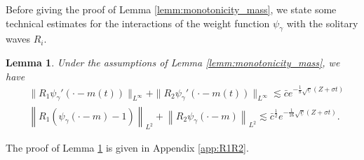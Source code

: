 \documentclass[reqno,10pt]{amsart}
\newtheorem{lemm}{Lemma}[section]
\numberwithin{equation}{section}
\begin{document}
 Before giving the proof of Lemma \ref{lemm:monotonicity_mass}, we state some technical estimates for the interactions of the weight function $\psi_{\gamma}$ with the solitary waves $R_i$. 

 \begin{lemm} \label{lemma:est:Rpsi}
 Under the assumptions of Lemma \ref{lemm:monotonicity_mass}, we have
\begin{align} 
				&\| R_1 \psi_\gamma'\left( \cdot - m(t)\right) \|_{L^\infty} + \| R_2 \psi_\gamma'\left( \cdot - m(t)\right) \|_{L^\infty} \lesssim \bar{c} e^{-\frac18 \sqrt{\underline{c}} \left( Z + \sigma t\right)} \label{est:Rpsi} \\ 
				&\left\| R_1 \left(\psi_\gamma \left( \cdot - m\right) -1 \right) \right\|_{L^2} + \left\| R_2 \psi_\gamma\left( \cdot - m\right) \right\|_{L^2} \lesssim \bar{c}^\frac12 e^{- \frac1{16} \sqrt{\underline{c}}\left( Z + \sigma t\right)}. \label{ineq:R_psi_L2}
			\end{align}
 \end{lemm}
 The proof of Lemma \ref{lemma:est:Rpsi} is given in Appendix \ref{app:R1R2}. 
	
\end{document}
